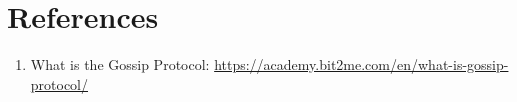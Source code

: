 \documentclass[a4paper,12pt]{article}
\begin{document}
\section{References}

\begin{enumerate}
    \item What is the Gossip Protocol: \url{https://academy.bit2me.com/en/what-is-gossip-protocol/}
\end{enumerate}
\end{document}
